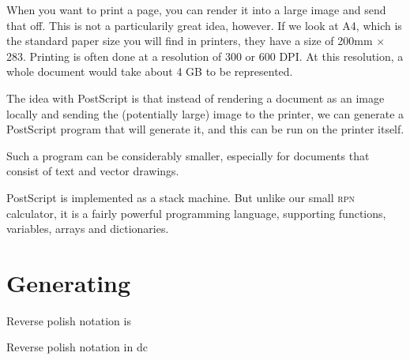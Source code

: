 \documentclass[a4paper,twocolumn]{article}
\begin{document}
When you want to print a page, you can render it into a large image and send that off. This is not a particularily great idea, however. If we look at A4, which is the standard paper size you will find in printers, they have a size of 200mm $\times$ 283. Printing is often done at a resolution of 300 or 600 DPI. At this resolution, a whole document would take about 4 GB to be represented.

The idea with PostScript is that instead of rendering a document as an image locally and sending the (potentially large) image to the printer, we can generate a PostScript program that will generate it, and this can be run on the printer itself.

Such a program can be considerably smaller, especially for documents that consist of text and vector drawings.

PostScript is implemented as a stack machine. But unlike our small \textsc{rpn} calculator, it is a fairly powerful programming language, supporting functions, variables, arrays and dictionaries.

\section{Generating}

Reverse polish notation is


Reverse polish notation in dc
\end{document}
